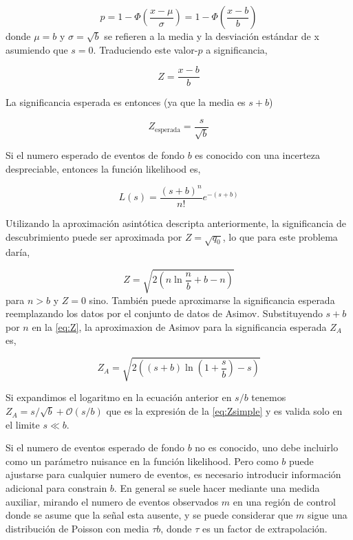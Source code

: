 \begin{equation}
  p = 1 - \Phi \left( \frac{x-\mu}{\sigma} \right) = 1 - \Phi \left(
  \frac{x-b}{b} \right)
\end{equation}
%
donde $\mu=b$ y $\sigma = \sqrt{b}$ se refieren a la media y la desviación
estándar de x asumiendo que $s=0$. Traduciendo este valor-$p$ a significancia,

\begin{equation}
  Z = \frac{x-b}{b}
\end{equation}

La significancia esperada es entonces (ya que la media es $s+b$)

\begin{equation}
  Z_\text{esperada} = \frac{s}{\sqrt{b}}
  \label{eq:Zsimple}
\end{equation}

Si el numero esperado de eventos de fondo $b$ es conocido con una incerteza
despreciable, entonces la función likelihood es,

\begin{equation}
  L(s) = \frac{(s+b)^n}{n!} e^{-(s+b)}
\end{equation}

Utilizando la aproximación asintótica descripta anteriormente, la significancia
de descubrimiento puede ser aproximada por $Z=\sqrt{q_0}$, lo que para este
problema daría,

\begin{equation}
  Z = \sqrt{2\left( n \ln \frac{n}{b} +b -n \right)}
  \label{eq:Z}
\end{equation}
%
para $n>b$ y $Z=0$ sino. También puede aproximarse la significancia esperada
reemplazando los datos por el conjunto de datos de Asimov. Substituyendo $s+b$
por $n$ en la {\eq} \eqref{eq:Z}, la aproximaxion de Asimov para la
significancia esperada $Z_A$ es,

\begin{equation}
  Z_A = \sqrt{2\left( (s+b) \ln \left( 1 + \frac{s}{b}\right) - s \right)}
\end{equation}

Si expandimos el logaritmo en la ecuación anterior en $s/b$ tenemos $Z_A =
s/\sqrt{b} + \mathcal{O}(s/b)$ que es la expresión de la {\eq}
\eqref{eq:Zsimple} y es valida solo en el limite $s \ll b$.

Si el numero de eventos esperado de fondo $b$ no es conocido, uno debe incluirlo
como un parámetro nuisance en la función likelihood. Pero como $b$ puede
ajustarse para cualquier numero de eventos, es necesario introducir información
adicional para constrain $b$. En general se suele hacer mediante una medida
auxiliar, mirando el numero de eventos observados $m$ en una región de control
donde se asume que la señal esta ausente, y se puede considerar que $m$ sigue
una distribución de Poisson con media $\tau b$, donde $\tau$ es un factor de
extrapolación.

